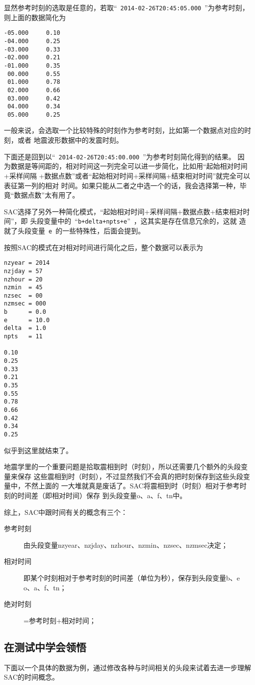 显然参考时刻的选取是任意的，若取``~\lstinline{2014-02-26T20:45:05.000}~''为参考时刻，
则上面的数据简化为
\begin{lstlisting}[style=Bash]
-05.000     0.10
-04.000     0.25
-03.000     0.33
-02.000     0.21
-01.000     0.35
 00.000     0.55
 01.000     0.78
 02.000     0.66
 03.000     0.42
 04.000     0.34
 05.000     0.25
\end{lstlisting}

一般来说，会选取一个比较特殊的时刻作为参考时刻，比如第一个数据点对应的时刻，或者
地震波形数据中的发震时刻。

下面还是回到以``~\lstinline{2014-02-26T20:45:00.000}~''为参考时刻简化得到的结果。
因为数据是等间距的，相对时间这一列完全可以进一步简化，比如用``起始相对时间+采样间隔
+数据点数''或者``起始相对时间+采样间隔+结束相对时间''就完全可以表征第一列的相对
时间。如果只能从二者之中选一个的话，我会选择第一种，毕竟``数据点数''太有用了。

SAC选择了另外一种简化模式，``起始相对时间+采样间隔+数据点数+结束相对时间''，即
头段变量中的~``\lstinline{b+delta+npts+e}''~，这其实是存在信息冗余的，这就
造就了头段变量~\lstinline{e}~的一些特殊性，后面会提到。

按照SAC的模式在对相对时间进行简化之后，整个数据可以表示为
\begin{lstlisting}[style=Bash]
nzyear = 2014 
nzjday = 57
nzhour = 20
nzmin  = 45
nzsec  = 00
nzmsec = 000
b      = 0.0
e      = 10.0
delta  = 1.0
npts   = 11

0.10
0.25
0.33
0.21
0.35
0.55
0.78
0.66
0.42
0.34
0.25
\end{lstlisting}

似乎到这里就结束了。

地震学里的一个重要问题是拾取震相到时（时刻），所以还需要几个额外的头段变量来保存
这些震相到时（时刻），不过显然我们不会真的把时刻保存到这些头段变量中，不然上面的
一大堆就真是废话了。SAC将震相到时（时刻）相对于参考时刻的时间差（即相对时间）保存
到头段变量o、a、f、tn中。

综上，SAC中跟时间有关的概念有三个：
\begin{description}
    \item [参考时刻] 由头段变量nzyear、nzjday、nzhour、nzmin、nzsec、nzmsec决定；
    \item [相对时间] 即某个时刻相对于参考时刻的时间差（单位为秒），保存到头段变量b、e
    o、a、f、tn；
    \item [绝对时刻] =参考时刻+相对时间；
\end{description}

\subsection{在测试中学会领悟}
下面以一个具体的数据为例，通过修改各种与时间相关的头段来试着去进一步理解SAC的时间概念。

